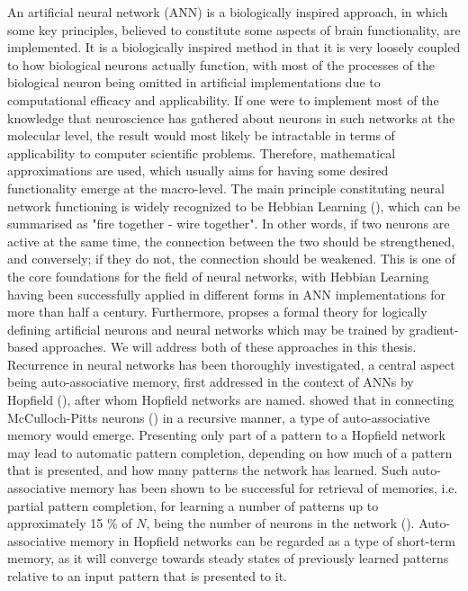 An artificial neural network (ANN) is a biologically inspired approach, in which some key principles, believed to constitute some aspects of brain functionality, are implemented. It is a biologically inspired method in that it is very loosely coupled to how biological neurons actually function, with most of the processes of the biological neuron being omitted in artificial implementations due to computational efficacy and applicability. If one were to implement most of the knowledge that neuroscience has gathered about neurons in such networks at the molecular level, the result would most likely be intractable in terms of applicability to computer scientific problems. Therefore, mathematical approximations are used, which usually aims for having some desired functionality emerge at the macro-level. The main principle constituting neural network functioning is widely recognized to be Hebbian Learning (\cite{Hebb1949}), which can be summarised as "fire together - wire together". In other words, if two neurons are active at the same time, the connection between the two should be strengthened, and conversely; if they do not, the connection should be weakened. This is one of the core foundations for the field of neural networks, with Hebbian Learning having been successfully applied in different forms in ANN implementations for more than half a century. Furthermore, \cite{McCulloch1943} propses a formal theory for logically defining artificial neurons and neural networks which may be trained by gradient-based approaches. We will address both of these approaches in this thesis.
\\

Recurrence in neural networks has been thoroughly investigated, a central aspect being auto-associative memory, first addressed in the context of ANNs by Hopfield (\cite{Hopfield1982}), after whom Hopfield networks are named. \cite{Hopfield1982} showed that in connecting McCulloch-Pitts neurons (\cite{McCulloch1943}) in a recursive manner, a type of auto-associative memory would emerge. Presenting only part of a pattern to a Hopfield network may lead to automatic pattern completion, depending on how much of a pattern that is presented, and how many patterns the network has learned. Such auto-associative memory has been shown to be successful for retrieval of memories, i.e. partial pattern completion, for learning a number of patterns up to approximately 15 \% of $N$, being the number of neurons in the network (\cite{Hopfield1982}). Auto-associative memory in Hopfield networks can be regarded as a type of short-term memory, as it will converge towards steady states of previously learned patterns relative to an input pattern that is presented to it.

